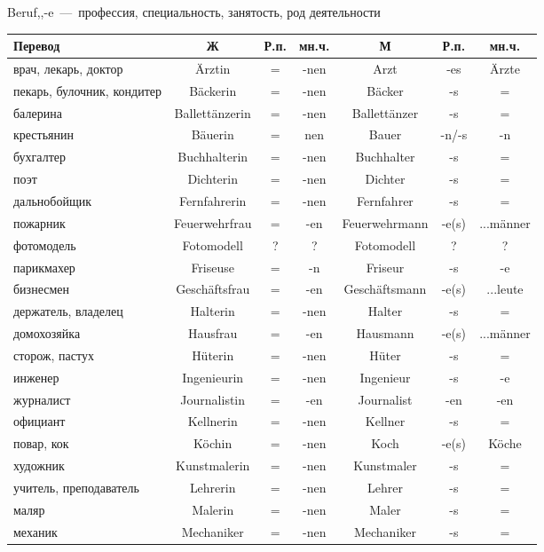 
 Beruf,,-e~---~профессия, специальность, занятость, род деятельности

\begin{longtable}{|p{4cm}|c|c|c|c|c|c|}
\hline
Перевод & Ж & Р.п. & мн.ч. & М & Р.п. & мн.ч. \\
\hline\endhead

 врач, лекарь, доктор & \"Arztin & = & -nen & Arzt & -es & \"Arzte \\
 пекарь, булочник, кондитер & B\"ackerin & = & -nen & B\"acker & -s & = \\
 балерина & Ballett\"anzerin & = & -nen & Ballett\"anzer & -s & = \\
 крестьянин & B\"auerin & = & nen & Bauer & -n/-s & -n \\
 бухгалтер & Buchhalterin & = & -nen & Buchhalter & -s & = \\
 поэт & Dichterin & = & -nen & Dichter & -s & = \\
 дальнобойщик & Fernfahrerin & = & -nen & Fernfahrer & -s & = \\
 пожарник & Feuerwehrfrau & = & -en & Feuerwehrmann & -e(s) & ...m\"anner \\
 фотомодель & Fotomodell & ? & ? & Fotomodell & ? & ? \\
 парикмахер & Friseuse & = & -n & Friseur & -s & -e \\
 бизнесмен & Gesch\"aftsfrau & = & -en & Gesch\"aftsmann & -e(s) & ...leute \\
 держатель, владелец & Halterin & = & -nen & Halter & -s & = \\
 домохозяйка & Hausfrau & = & -en & Hausmann & -e(s) & ...m\"anner \\
 сторож, пастух & H\"uterin & = & -nen & H\"uter & -s & = \\
 инженер & Ingenieurin & = & -nen & Ingenieur & -s & -e \\
 журналист & Journalistin & = & -en & Journalist & -en & -en \\
 официант & Kellnerin & = & -nen & Kellner & -s & = \\
 повар, кок & K\"ochin & = & -nen & Koch & -e(s) & K\"oche \\
 художник & Kunstmalerin & = & -nen & Kunstmaler & -s & = \\
 учитель, преподаватель & Lehrerin & = & -nen & Lehrer & -s & = \\
 маляр & Malerin & = & -nen & Maler & -s & = \\
 механик & Mechaniker & = & -nen & Mechaniker & -s & = \\

\end{longtable}
